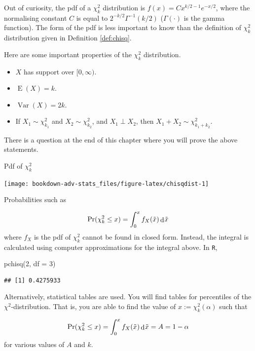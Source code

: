 \documentclass[
]{book}
\newenvironment{Shaded}{\begin{snugshade}}{\end{snugshade}}
\newcommand{\AttributeTok}[1]{\textcolor[rgb]{0.77,0.63,0.00}{#1}}
\newcommand{\DecValTok}[1]{\textcolor[rgb]{0.00,0.00,0.81}{#1}}
\newcommand{\FunctionTok}[1]{\textcolor[rgb]{0.00,0.00,0.00}{#1}}
\newcommand{\NormalTok}[1]{#1}
\providecommand{\tightlist}{%
  \setlength{\itemsep}{0pt}\setlength{\parskip}{0pt}}
\DeclareMathOperator{\E}{E}
\DeclareMathOperator{\Var}{Var}
\DeclareMathOperator{\dd}{d}
\newcommand{\dint}{\dd\hspace{0.5pt}\!}
\theoremstyle{definition}
\theoremstyle{definition}
\theoremstyle{definition}
\theoremstyle{definition}
\theoremstyle{remark}
\begin{document}
Out of curiosity, the pdf of a \(\chi^2_k\) distribution is \(f(x) = Cx^{k/2-1}e^{-x/2}\), where the normalising constant \(C\) is equal to \(2^{-k/2}\Gamma^{-1}(k/2)\) (\(\Gamma(\cdot)\) is the gamma function).
The form of the pdf is less important to know than the definition of \(\chi^2_k\) distribution given in Definition \ref{def:chisq}.

Here are some important properties of the \(\chi^2_k\) distribution.

\begin{itemize}
\tightlist
\item
  \(X\) has support over \([0,\infty)\).
\item
  \(\E(X)=k\).
\item
  \(\Var(X) = 2k\).
\item
  If \(X_1\sim\chi^2_{k_1}\) and \(X_2\sim\chi^2_{k_2}\), and
  \(X_1 \perp X_2\), then \(X_1+X_2\sim \chi^2_{k_1+k_2}\).
\end{itemize}

There is a question at the end of this chapter where you will prove the above statements.

Pdf of \(\chi^2_k\)

\begin{center}\texttt{[image: bookdown-adv-stats\_files/figure-latex/chisqdist-1]} \end{center}

Probabilities such as

\[\Pr(\chi_k^2 \leq x) = \int_0^x f_X(\tilde x) \dint \tilde x\] where \(f_X\) is the pdf of \(\chi^2_k\) cannot be found in closed form.
Instead, the integral is calculated using computer approximations for the integral above.
In \texttt{R},

\begin{Shaded}
\begin{Highlighting}[]
\FunctionTok{pchisq}\NormalTok{(}\DecValTok{2}\NormalTok{, }\AttributeTok{df =} \DecValTok{3}\NormalTok{)}
\end{Highlighting}
\end{Shaded}

\begin{verbatim}
## [1] 0.4275933
\end{verbatim}

Alternatively, statistical tables are used.
You will find tables for percentiles of the \(\chi^2\)-distribution.
That is, you are able to find the value of \(x:=\chi^2_k(\alpha)\) such that

\[\Pr(\chi_k^2 \leq x) = \int_0^x f_X(\tilde x) \dint \tilde x = A = 1-\alpha\]
for various values of \(A\) and \(k\).
\end{document}
